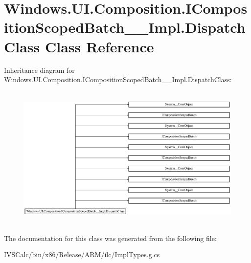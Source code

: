 \hypertarget{class_windows_1_1_u_i_1_1_composition_1_1_i_composition_scoped_batch_____impl_1_1_dispatch_class}{}\section{Windows.\+U\+I.\+Composition.\+I\+Composition\+Scoped\+Batch\+\_\+\+\_\+\+Impl.\+Dispatch\+Class Class Reference}
\label{class_windows_1_1_u_i_1_1_composition_1_1_i_composition_scoped_batch_____impl_1_1_dispatch_class}
Inheritance diagram for Windows.\+U\+I.\+Composition.\+I\+Composition\+Scoped\+Batch\+\_\+\+\_\+\+Impl.\+Dispatch\+Class\+:\begin{figure}[H]
\begin{center}
\leavevmode
\includegraphics[height=7.213115cm]{class_windows_1_1_u_i_1_1_composition_1_1_i_composition_scoped_batch_____impl_1_1_dispatch_class}
\end{center}
\end{figure}


The documentation for this class was generated from the following file\+:\begin{DoxyCompactItemize}
\item 
I\+V\+S\+Calc/bin/x86/\+Release/\+A\+R\+M/ilc/Impl\+Types.\+g.\+cs\end{DoxyCompactItemize}
